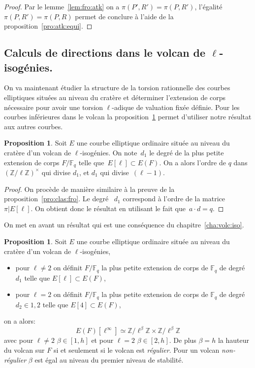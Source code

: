 \documentclass[10pt,a4paper]{book}
\theoremstyle{plain}
\theoremstyle{definition}
\theoremstyle{definition}
\theoremstyle{definition}
\newtheorem{prop}[thm]{Proposition}
\theoremstyle{definition}
\theoremstyle{remark}
\theoremstyle{remark}
\theoremstyle{definition}
\begin{document}
\begin{proof}
Par le lemme~\ref{lem:fro:atk} on a $\pi(P',R')=\pi(P,R')$, l'égalité 
$\pi(P,R')=\pi(P,R)$ permet de conclure à l'aide de la 
proposition~\ref{pro:atk:equi}.
\end{proof}

\subsection{Calculs de directions dans le volcan de $\ell$-isogénies.}
\label{sub:atk:cal}
On va maintenant étudier la structure de la torsion rationnelle des courbes 
elliptiques situées au niveau du cratère et déterminer l'extension de corps 
nécessaire pour avoir une torsion $\ell$-adique de valuation fixée définie.
Pour les courbes inférieures dans le volcan la 
proposition~\ref{pro:atk:d1} permet d'utiliser notre résultat aux autres
courbes. 


\begin{prop}
Soit $E$ une courbe elliptique ordinaire située au niveau du cratère d'un 
volcan de $\ell$-isogénies. On note~$d_1$ le degré de la plus 
petite extension de corps $F/\mathbb{F}_q$ telle que~$E[\ell]\subset E(F)$. 
On  a alors l'ordre de $q$ dans $(\mathbb{Z}/ \ell \mathbb{Z})^\times$ qui divise $d_1$,
et $d_1$ qui divise~$(\ell-1)$.
\end{prop}

\begin{proof}
On procède de manière similaire à la preuve de la proposition~\ref{pro:clas:fro}.
Le degré ~$d_1$ correspond à l'ordre de la matrice~$\pi|E[\ell]$.
On obtient donc le résultat en utilisant le fait que~$a \cdot d = q$. 
\end{proof}

On met en avant un résultat qui est une conséquence du 
chapitre~\ref{cha:volc:iso}. 

\begin{prop}
\label{pro:atk:d1}
Soit $E$ une courbe elliptique ordinaire située au niveau du cratère d'un 
volcan de $\ell$-isogénies,
\begin{itemize}
\item pour $\ell \neq 2$ on définit $F/\mathbb{F}_q$ la 
plus petite extension de corps de $\mathbb{F}_q$ de degré $d_1$ telle que 
$E[\ell] \subset E(F)$,
\item pour $\ell=2$ on définit $F/\mathbb{F}_q$ la 
plus petite extension de corps de $\mathbb{F}_q$ de degré $d_2 \in {1,2}$ telle
que $E[4] \subset E(F)$,
\end{itemize}
on a alors:
\[
E(F)[\ell^{\infty}] \simeq \mathbb{Z}/ \ell^{\beta} \mathbb{Z} \times \mathbb{Z}/ \ell^{\beta} \mathbb{Z} 
\]
avec pour $\ell \neq 2$ $\beta \in [1,h]$ et pour $\ell=2$ $\beta \in [2,h]$. De 
plus $\beta=h$ la hauteur du volcan sur $F$ si et seulement si le volcan est \emph{régulier}.
Pour un volcan \emph{non-régulier} $\beta$ est égal au niveau du premier niveau de stabilité. 
\end{prop}
\end{document}
